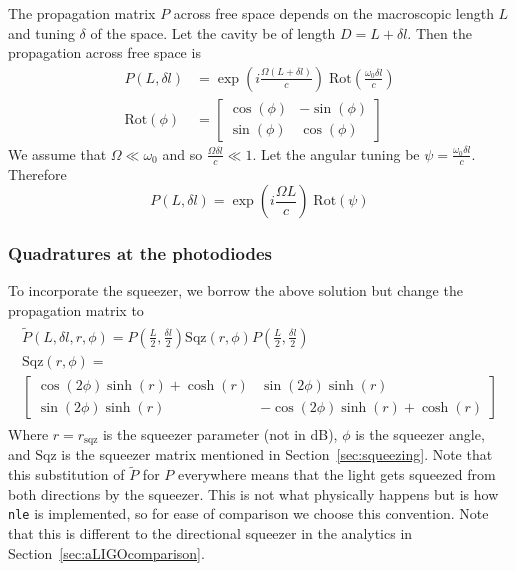 \documentclass[aps,pra,superscriptaddress,reprint,nofootinbib]{revtex4-1}
\newcommand{\code}[1]{\texttt{#1}}
\begin{document}
The propagation matrix $P$ across free space depends on the macroscopic length $L$ and tuning $\delta$ of the space. Let the cavity be of length $D = L + \delta l$. Then the propagation across free space is
\begin{align}
P(L, \delta l) &= \exp\left(i\frac{\Omega (L + \delta l)}{c}\right) \;\mathrm{Rot}\left(\frac{\omega_0 \delta l}{c}\right) \\
\mathrm{Rot}(\phi) &= \begin{bmatrix}
\cos(\phi) & -\sin(\phi)\\ 
\sin(\phi) & \cos(\phi)\nonumber
\end{bmatrix}
\end{align}
We assume that $\Omega \ll \omega_0$ and so $\frac{\Omega \delta l}{c} \ll 1$. Let the angular tuning be $\psi = \frac{\omega_0 \delta l}{c}$. Therefore
\begin{equation}
P(L, \delta l) = \exp\left(i\frac{\Omega L}{c}\right) \;\mathrm{Rot}\left(\psi\right)
\end{equation}

\subsubsection{Quadratures at the photodiodes}

To incorporate the squeezer, we borrow the above solution but change the propagation matrix to
\begin{align}
	\begin{gathered}
	\tilde{P}(L, \delta l, r, \phi) = P\left(\frac{L}{2}, \frac{\delta l}{2}\right) \mathrm{Sqz}(r, \phi) P\left(\frac{L}{2}, \frac{\delta l}{2}\right) \\
	\mathrm{Sqz}(r, \phi) =\\
	\begin{bmatrix}
	\cos(2 \phi) \sinh(r) + \cosh(r) & \sin(2\phi) \sinh(r)\\ 
	\sin(2\phi) \sinh(r) & -\cos(2 \phi) \sinh(r) + \cosh(r)
	\end{bmatrix}
	\end{gathered}
\end{align}
Where $r = r_\mathrm{sqz}$ is the squeezer parameter (not in dB), $\phi$ is the squeezer angle, and $\mathrm{Sqz}$ is the squeezer matrix mentioned in Section~\ref{sec:squeezing}. Note that this substitution of $\tilde{P}$ for $P$ everywhere means that the light gets squeezed from both directions by the squeezer. This is not what physically happens but is how \code{nle} is implemented, so for ease of comparison we choose this convention. Note that this is different to the directional squeezer in the analytics in Section~\ref{sec:aLIGOcomparison}.
\end{document}
